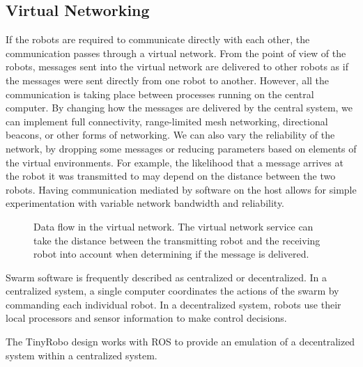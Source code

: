 \documentclass[]{article}
\begin{document}
\subsection{Virtual Networking}

If the robots are required to communicate directly with each other, the communication passes through a virtual network.
From the point of view of the robots, messages sent into the virtual network are delivered to other robots as if the messages were sent directly from one robot to another. 
However, all the communication is taking place between processes running on the central computer.
By changing how the messages are delivered by the central system, we can implement full connectivity, range-limited mesh networking, directional beacons, or other forms of networking. 
We can also vary the reliability of the network, by dropping some messages or reducing parameters based on elements of the virtual environments. 
For example, the likelihood that a message arrives at the robot it was transmitted to may depend on the distance between the two robots. 
Having communication mediated by software on the host allows for simple experimentation with variable network bandwidth and reliability. 

\begin{figure}[h]
	\centering
	\caption{Data flow in the virtual network. The virtual network service can take the distance between the transmitting robot and the receiving robot into account when determining if the message is delivered.}
\end{figure}

Swarm software is frequently described as centralized or decentralized. 
In a centralized system, a single computer coordinates the actions of the swarm by commanding each individual robot. 
In a decentralized system, robots use their local processors and sensor information to make control decisions. 

The TinyRobo design works with ROS to provide an emulation of a decentralized system within a centralized system. 
\end{document}
